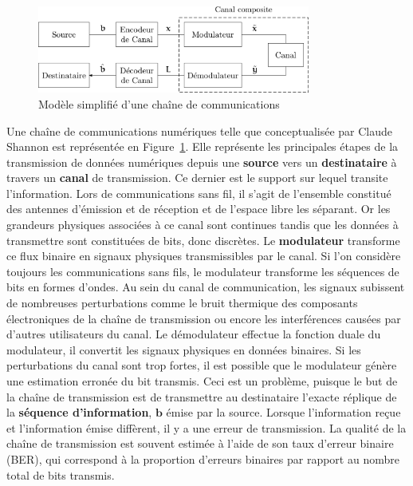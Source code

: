 \begin{figure}[t]
\centering
\includegraphics[width=0.8\textwidth]{main/ch1_fig/chaine_com}
\caption{Modèle simplifié d'une chaîne de communications}
\label{fig:chaine_com}
\end{figure}
Une chaîne de communications numériques telle que conceptualisée par Claude Shannon \cite{shannon_mathematical_2001} est représentée en Figure~\ref{fig:chaine_com}.
Elle représente les principales étapes de la transmission de données numériques depuis une \textbf{source} vers un \textbf{destinataire} à travers un \textbf{canal} de transmission.
Ce dernier est le support sur lequel transite l'information. Lors de communications sans fil, il s'agit de l'ensemble constitué des antennes d'émission et de réception et de l'espace libre les séparant. Or les grandeurs physiques associées à ce canal sont continues tandis que les données à transmettre sont constituées de bits, donc discrètes. Le \textbf{modulateur} transforme ce flux binaire en signaux physiques transmissibles par le canal. Si l'on considère toujours les communications sans fils, le modulateur transforme les séquences de bits en formes d'ondes. Au sein du canal de communication, les signaux subissent de nombreuses perturbations comme le bruit thermique des composants électroniques de la chaîne de transmission ou encore les interférences causées par d'autres utilisateurs du canal. Le démodulateur effectue la fonction duale du modulateur, il convertit les signaux physiques en données binaires. Si les perturbations du canal sont trop fortes, il est possible que le modulateur génère une estimation erronée du bit transmis. Ceci est un problème, puisque le but de la chaîne de transmission est de transmettre au destinataire l'exacte réplique de la \textbf{séquence d'information}, $\mathbold{b}$ émise par la source. Lorsque l'information reçue et l'information émise diffèrent, il y a une erreur de transmission. La qualité de la chaîne de transmission est souvent estimée à l'aide de son taux d'erreur binaire (BER), qui correspond à la proportion d'erreurs binaires par rapport au nombre total de bits transmis.

